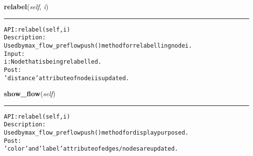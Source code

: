     \label{coinor:gimpy:graph:Graph:relabel}

    \vspace{0.5ex}

\hspace{.8\funcindent}\begin{boxedminipage}{\funcwidth}

    \raggedright \textbf{relabel}(\textit{self}, \textit{i})

    \vspace{-1.5ex}

    \rule{\textwidth}{0.5\fboxrule}
\setlength{\parskip}{2ex}
\begin{alltt}

API: relabel(self, i)
Description:
Used by max\_flow\_preflowpush() method for relabelling node i.
Input:
    i: Node that is being relabelled.
Post:
    'distance' attribute of node i is updated.
\end{alltt}

\setlength{\parskip}{1ex}
    \end{boxedminipage}

    \label{coinor:gimpy:graph:Graph:show_flow}

    \vspace{0.5ex}

\hspace{.8\funcindent}\begin{boxedminipage}{\funcwidth}

    \raggedright \textbf{show\_flow}(\textit{self})

    \vspace{-1.5ex}

    \rule{\textwidth}{0.5\fboxrule}
\setlength{\parskip}{2ex}
\begin{alltt}

API: relabel(self, i)
Description:
Used by max\_flow\_preflowpush() method for display purposed.
Post:
    'color' and 'label' attribute of edges/nodes are updated.
\end{alltt}

\setlength{\parskip}{1ex}
    \end{boxedminipage}

